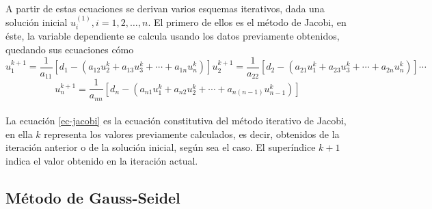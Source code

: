 \documentclass[letterpaper, openright, 12pt]{book}
\begin{document}
    \paragraph*{}
        A partir de estas ecuaciones se derivan varios esquemas iterativos, dada
        una solución inicial $u_{i}^{(1)}, i = 1, 2, \dotsc, n$. El primero de
        ellos es el método de Jacobi, en éste, la variable dependiente se
        calcula usando los datos previamente obtenidos, quedando sus ecuaciones
        cómo
        \begin{subequations}
            \begin{equation*}
                u_{1}^{k+1} = \frac{1}{a_{11}} \left[ d_{1} - \left( a_{12}u_{2}^{k} + a_{13}u_{3}^{k} + \dotsb + a_{1n}u_{n}^k \right) \right]
            \end{equation*}
            \begin{equation*}
                u_{2}^{k+1} = \frac{1}{a_{22}} \left[ d_{2} - \left( a_{21}u_{1}^{k} + a_{23}u_{3}^{k} + \dotsb + a_{2n}u_{n}^{k} \right) \right]
            \end{equation*}
            \begin{equation*}
                \dotsb
            \end{equation*}
        \end{subequations}
        \begin{equation}
            u_{n}^{k+1} = \frac{1}{a_{nn}} \left[ d_{n} - \left( a_{n1}u_{1}^{k} + a_{n2}u_{2}^{k} + \dotsb + a_{n\left( n-1 \right)}u_{n-1}^{k} \right) \right]
            \label{ec-jacobi}
        \end{equation}
    \paragraph*{}
        La ecuación \ref{ec-jacobi} es la ecuación constitutiva del método
        iterativo de Jacobi, en ella $k$ representa los valores previamente
        calculados, es decir, obtenidos de la iteración anterior o de la
        solución inicial, según sea el caso. El superíndice $k+1$ indica el
        valor obtenido en la iteración actual.
    \subsection{Método de Gauss-Seidel}
\end{document}
